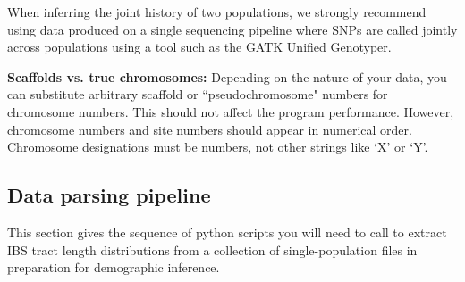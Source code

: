\documentclass[12pt]{article}
\begin{document}
When inferring the joint history of two populations, we strongly recommend using data produced on a single sequencing pipeline where SNPs are called jointly across populations using a tool such as the GATK Unified Genotyper. 


\textbf{Scaffolds vs. true chromosomes:} Depending on the nature of your data, you can substitute arbitrary scaffold or ``pseudochromosome" numbers for chromosome numbers. This should not affect the program performance. However, chromosome numbers and site numbers should appear in numerical order. Chromosome designations must be numbers, not other strings like `X' or `Y'.



\subsection{Data parsing pipeline}

This section gives the sequence of python scripts you will need to call to extract IBS tract length distributions from a collection of single-population files in preparation for demographic inference.
\end{document}
